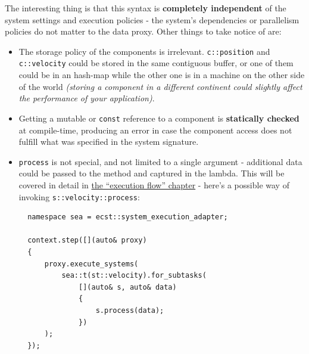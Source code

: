 \documentclass[twoside, 12pt, a4paper, openany]{book}
\begin{document}
The interesting thing is that this syntax is \textbf{completely
independent} of the system settings and execution policies - the
system's dependencies or parallelism policies do not matter to the data
proxy. Other things to take notice of are:

\begin{itemize}
\item
  The storage policy of the components is irrelevant.
  \texttt{c::position}
  and
  \texttt{c::velocity}
  could be stored in the same contiguous buffer, or one of them could be
  in an hash-map while the other one is in a machine on the other side
  of the world \emph{(storing a component in a different continent could
  slightly affect the performance of your application)}.
\item
  Getting a mutable or
  \texttt{const}
  reference to a component is \textbf{statically checked} at
  compile-time, producing an error in case the component access does not
  fulfill what was specified in the system signature.
\item
  \texttt{process}
  is not special, and not limited to a single argument - additional data
  could be passed to the method and captured in the lambda. This will be
  covered in detail in \protect\hyperlink{chap_flow}{the ``execution
  flow'' chapter} - here's a possible way of invoking
  \texttt{s::velocity::process}:

  \begin{verbatim}
  namespace sea = ecst::system_execution_adapter;

  context.step([](auto& proxy)
  {
      proxy.execute_systems(
          sea::t(st::velocity).for_subtasks(
              [](auto& s, auto& data)
              {
                  s.process(data);
              })
      );
  });
  \end{verbatim}
\end{itemize}
\end{document}
